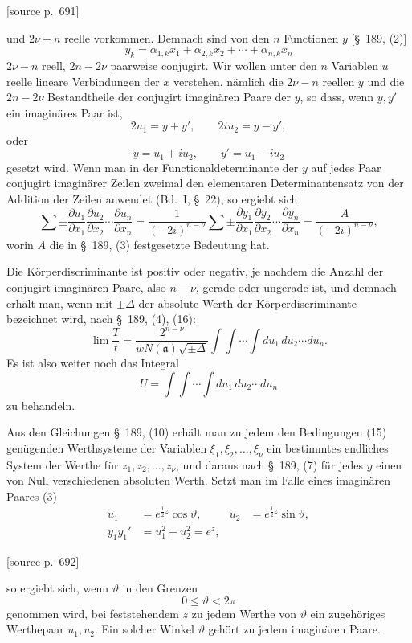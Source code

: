 \documentclass[11pt]{article}
\newcommand{\srcpage}[1]{\par\medskip\noindent\textsf{[source p.~#1]}\par\smallskip}
\begin{document}
\srcpage{691}
und $2\nu-n$ reelle vorkommen. Demnach sind von den $n$ Functionen $y$ [\S~189, (2)]
\begin{equation}
y_k=\alpha_{1,k}x_1+\alpha_{2,k}x_2+\cdots+\alpha_{n,k}x_n
\tag{2}
\end{equation}
$2\nu-n$ reell, $2n-2\nu$ paarweise conjugirt. Wir wollen unter den $n$ Variablen $u$ reelle lineare Verbindungen der $x$ verstehen, nämlich die $2\nu-n$ reellen $y$ und die $2n-2\nu$ Bestandtheile der conjugirt imaginären Paare der $y$, so dass, wenn $y,y'$ ein imaginäres Paar ist,
\[
2u_1=y+y',\qquad 2iu_2=y-y',
\]
oder
\begin{equation}
y=u_1+iu_2,
\qquad y'=u_1-iu_2
\tag{3}
\end{equation}
gesetzt wird. Wenn man in der Functionaldeterminante der $y$ auf jedes Paar conjugirt imaginärer Zeilen zweimal den elementaren Determinantensatz von der Addition der Zeilen anwendet (Bd.~I, \S~22), so ergiebt sich
\[
\sum\pm
\frac{\partial u_1}{\partial x_1}
\frac{\partial u_2}{\partial x_2}\cdots
\frac{\partial u_n}{\partial x_n}
=
\frac1{(-2i)^{n-\nu}}
\sum\pm
\frac{\partial y_1}{\partial x_1}
\frac{\partial y_2}{\partial x_2}\cdots
\frac{\partial y_n}{\partial x_n}
=
\frac{A}{(-2i)^{n-\nu}},
\]
worin $A$ die in \S~189, (3) festgesetzte Bedeutung hat.

Die Körperdiscriminante ist positiv oder negativ, je nachdem die Anzahl der conjugirt imaginären Paare, also $n-\nu$, gerade oder ungerade ist, und demnach erhält man, wenn mit $\pm\Delta$ der absolute Werth der Körperdiscriminante bezeichnet wird, nach \S~189, (4), (16):
\begin{equation}
\lim\frac{T}{t}
=
\frac{2^{n-\nu}}{wN(\mathfrak a)\sqrt{\pm\Delta}}
\int\!\int\cdots\int du_1\,du_2\cdots du_n.
\tag{4}
\end{equation}
Es ist also weiter noch das Integral
\[
U=\int\!\int\cdots\int du_1\,du_2\cdots du_n
\]
zu behandeln.

Aus den Gleichungen \S~189, (10) erhält man zu jedem den Bedingungen (15) genügenden Werthsysteme der Variablen $\xi_1,\xi_2,\ldots,\xi_\nu$ ein bestimmtes endliches System der Werthe für $z_1,z_2,\ldots,z_\nu$, und daraus nach \S~189, (7) für jedes $y$ einen von Null verschiedenen absoluten Werth. Setzt man im Falle eines imaginären Paares (3)
\begin{align}
u_1&=e^{\frac12 z}\cos\vartheta,
&u_2&=e^{\frac12 z}\sin\vartheta,
\tag{5}\\
y_1y_1'&=u_1^2+u_2^2=e^z,
\tag{6}
\end{align}
\srcpage{692}
so ergiebt sich, wenn $\vartheta$ in den Grenzen
\[
0\leq\vartheta<2\pi
\]
genommen wird, bei feststehendem $z$ zu jedem Werthe von $\vartheta$ ein zugehöriges Werthepaar $u_1,u_2$. Ein solcher Winkel $\vartheta$ gehört zu jedem imaginären Paare.
\end{document}
